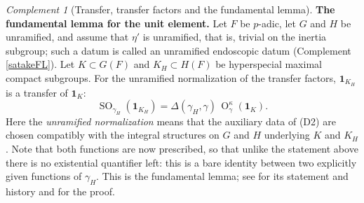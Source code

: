 \documentclass[11pt,a4paper]{article}
\theoremstyle{definition}
\theoremstyle{plain}
\theoremstyle{remark}
\newtheorem{Rc}[shared]{Complement}
\theoremstyle{plain}
\DeclareMathOperator{\Or}{O}
\DeclareMathOperator{\SO}{SO}
\begin{document}
\begin{Rc}[Transfer, transfer factors and the fundamental lemma]
    \textbf{The fundamental lemma for the unit element.} Let $F$ be $p$-adic, let $G$ and $H$ be unramified, and assume that $\eta'$ is unramified, that is, trivial on the inertia subgroup; such a datum is called an unramified endoscopic datum (Complement \ref{satakeFL}). Let $K \subset G(F)$ and $K_H \subset H(F)$ be hyperspecial maximal compact subgroups. For the unramified normalization of the transfer factors, $\mathbf{1}_{K_H}$ is a transfer of $\mathbf{1}_K$:
    $$\SO_{\gamma_H}(\mathbf{1}_{K_H}) = \Delta(\gamma_H, \gamma) \, \Or^{\kappa}_{\gamma}(\mathbf{1}_K).$$
    Here the \textit{unramified normalization} means that the auxiliary data of (D2) are chosen compatibly with the integral structures on $G$ and $H$ underlying $K$ and $K_H$. Note that both functions are now prescribed, so that unlike the statement above there is no existential quantifier left: this is a bare identity between two explicitly given functions of $\gamma_H$. This is the fundamental lemma; see \cite{MR3051198} for its statement and history and \cite{MR2653248} for the proof.
\end{Rc}
\end{document}
